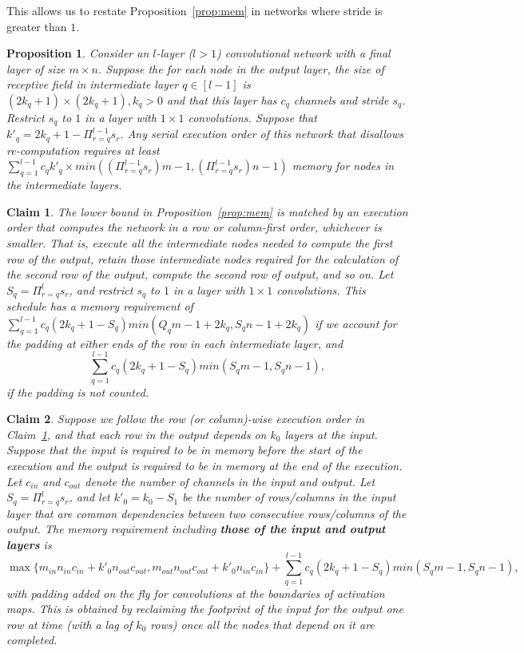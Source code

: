\documentclass[10pt]{article}
\newtheorem{proposition}{Proposition}
\newtheorem{claim}{Claim}
\begin{document}
This allows us to restate Proposition~\ref{prop:mem} in networks
where stride is greater than $1$.

\begin{proposition}
	\label{prop:mem-stride}
	Consider an $l$-layer ($l>1$) convolutional network with a
        final layer of size $m\times n$.  Suppose the for each node in
        the output layer, the size of receptive field in intermediate
        layer $q \in[l-1]$ is $(2k_q+1)\times(2k_q+1), k_q>0$ and that
        this layer has $c_q$ channels and stride $s_q$.  Restrict
        $s_q$ to $1$ in a layer with $1\times 1$ convolutions. Suppose
        that $k'_q = 2k_q +1 - \Pi_{r=q}^{l-1} s_r$.  Any serial
        execution order of this network that disallows re-computation
        requires at least $\sum_{q=1}^{l-1} c_q k'_q \times
        min((\Pi_{r=q}^{l-1} s_r) m -1 , (\Pi_{r=q}^{l-1} s_r)n-1)$
        memory for nodes in the intermediate layers.
\end{proposition}


\begin{claim}
\label{cl:upper-interm}
The lower bound in Proposition~\ref{prop:mem} is matched by an
execution order that computes the network in a row or column-first
order, whichever is smaller. That is, execute all the intermediate
nodes needed to compute the first row of the output, retain those
intermediate nodes required for the calculation of the second row of
the output, compute the second row of output, and so on.  Let $S_q =
\Pi_{r=q}^{l} s_r$, and restrict $s_q$ to $1$ in a layer with $1\times
1$ convolutions.  This schedule has a memory requirement of $
\sum_{q=1}^{l-1} c_q (2k_q+1 - S_q) min(Q_q m-1 + 2k_q, S_q n-1+2k_q)$
if we account for the padding at either ends of the row in each
intermediate layer, and
\[
\sum_{q=1}^{l-1} c_q (2k_q+1 - S_q) min(S_{q} m-1, S_{q} n-1),
\]
if the padding is not counted.
\end{claim}

\begin{claim}
\label{cl:upper}
Suppose we follow the row (or column)-wise execution order in
Claim~\ref{cl:upper-interm}, and that each row in the output depends
on $k_0$ layers at the input. Suppose that the input is required to be
in memory before the start of the execution and the output is required
to be in memory at the end of the execution. Let $c_{in}$ and
$c_{out}$ denote the number of channels in the input and output.  Let
$S_q = \Pi_{r=q}^l s_r$, and let $k'_0 = k_0 - S_1$ be the number
of rows/columns in the input layer that are common dependencies
between two consecutive rows/columns of the output. The memory
requirement including \textbf{those of the input and output layers} is
\[
\max\{m_{in}n_{in}c_{in} + k'_0 n_{out}c_{out}, m_{out}n_{out}c_{out} +
k'_0n_{in}c_{in} \} + \sum_{q=1}^{l-1} c_q (2k_q+1 -S_q) min(S_q m-1,
S_q n-1),
\] with
padding added on the fly for convolutions at the boundaries of
activation maps. This is obtained by reclaiming the footprint of the
input for the output one row at time (with a lag of $k_0$ rows) once
all the nodes that depend on it are completed.
\end{claim}
\end{document}
